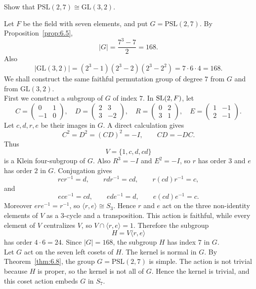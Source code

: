 \documentclass[../Odyssey_Project.tex]{subfiles}
\begin{document}
\begin{exercise}
\label{ex:6.4}
Show that $\mathrm{PSL}(2,7) \cong \mathrm{GL}(3,2)$.
\end{exercise}
\begin{solution}
Let $F$ be the field with seven elements, and put $G=\mathrm{PSL}(2,7)$. By Proposition~\ref{prop:6.5},
\[
    |G|=\frac{7^3-7}{2}=168.
\]
Also
\[
    |\mathrm{GL}(3,2)|=(2^3-1)(2^3-2)(2^3-2^2)=7\cdot 6\cdot 4=168.
\]
We shall construct the same faithful permutation group of degree $7$ from $G$ and from $\mathrm{GL}(3,2)$.\\
First we construct a subgroup of $G$ of index $7$. In $\operatorname{SL}(2,F)$, let
\[
    C=
    \begin{pmatrix}
        0  & 1\\
        -1 & 0
    \end{pmatrix},
    \quad
    D=
    \begin{pmatrix}
        2 & 3\\
        3 & -2
    \end{pmatrix},
    \quad
    R=
    \begin{pmatrix}
        0 & 2\\
        3 & 1
    \end{pmatrix},
    \quad
    E=
    \begin{pmatrix}
        1 & -1\\
        2 & -1
    \end{pmatrix}.
\]
Let $c,d,r,e$ be their images in $G$. A direct calculation gives
\[
    C^2=D^2=(CD)^2=-I,\qquad CD=-DC.
\]
Thus
\[
    V=\{1,c,d,cd\}
\]
is a Klein four-subgroup of $G$. Also $R^3=-I$ and $E^2=-I$, so $r$ has order $3$ and $e$ has order $2$ in $G$. Conjugation gives
\[
    rcr^{-1}=d,\qquad rdr^{-1}=cd,\qquad r(cd)r^{-1}=c,
\]
and
\[
    ece^{-1}=cd,\qquad ede^{-1}=d,\qquad e(cd)e^{-1}=c.
\]
Moreover $ere^{-1}=r^{-1}$, so $\langle r,e\rangle\cong S_3$. Hence $r$ and $e$ act on the three non-identity elements of $V$ as a $3$-cycle and a transposition. This action is faithful, while every element of $V$ centralizes $V$, so $V\cap \langle r,e\rangle=1$. Therefore the subgroup
\[
    H=V\langle r,e\rangle
\]
has order $4\cdot 6=24$. Since $|G|=168$, the subgroup $H$ has index $7$ in $G$.\\
Let $G$ act on the seven left cosets of $H$. The kernel is normal in $G$. By Theorem~\ref{thm:6.8}, the group $G=\mathrm{PSL}(2,7)$ is simple. The action is not trivial because $H$ is proper, so the kernel is not all of $G$. Hence the kernel is trivial, and this coset action embeds $G$ in $S_7$.\\

\end{solution}
\end{document}
